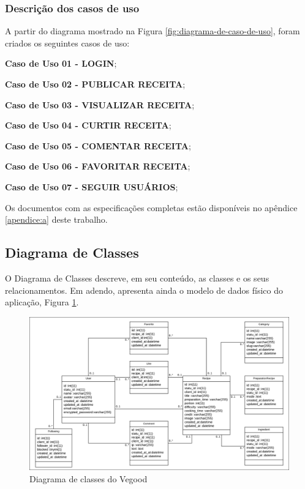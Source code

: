 \subsubsection{Descrição dos casos de uso} \label{sec:vegood: descricao-dos casos-de-uso}

A partir do diagrama mostrado na Figura \ref{fig:diagrama-de-caso-de-uso}, foram criados os seguintes casos de uso:

\begin{lista}
	\item \textbf{Caso de Uso 01 - LOGIN};
	\item \textbf{Caso de Uso 02 - PUBLICAR RECEITA};
	\item \textbf{Caso de Uso 03 - VISUALIZAR RECEITA};
	\item \textbf{Caso de Uso 04 - CURTIR RECEITA};
	\item \textbf{Caso de Uso 05 - COMENTAR RECEITA};
	\item \textbf{Caso de Uso 06 - FAVORITAR RECEITA};
	\item \textbf{Caso de Uso 07 - SEGUIR USUÁRIOS};
\end{lista}

Os documentos com as especificações completas estão disponíveis no apêndice \ref{apendice:a} deste trabalho.


\subsection{Diagrama de Classes}

O Diagrama de Classes descreve, em seu conteúdo, as classes e os seus relacionamentos. Em adendo, apresenta ainda o modelo de dados físico do aplicação, Figura \ref{fig:diagrama-de-classes}.

\begin{figure}[H]
	\caption{\label{fig:diagrama-de-classes}Diagrama de classes do Vegood}
	\centering
	\includegraphics[scale=0.9]{imagens/figura9.png}
\end{figure}



